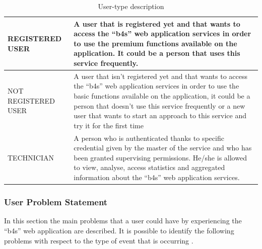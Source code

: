 \documentclass{article}
\begin{document}
\begin{table} [H]
    \begin{center}
        \begin{tabular}{|p{}|p{}|}
            \hline
            REGISTERED USER &   A user that is registered yet and that wants to access the “b4s” web application services in order to use the premium functions available  on  the application. It  could  be  a  person  that  uses this service frequently. \\ 
            \hline
            NOT REGISTERED USER &  
            A user  that  isn’t registered  yet  and  that  wants to access  the  “b4s”  web application  services  in  order  to  use the  basic functions available on the application, it could be a person that doesn’t use this service frequently or a new user that wants to start an approach to this service and try it for the first time  \\
            \hline
            TECHNICIAN &  
            A person who is authenticated thanks to specific credential given by the master of the service and who has been granted supervising permissions.   He/she  is  allowed  to  view,  analyse,  access  statistics  and aggregated information about the “b4s” web application services.
            \\
            \hline
        \end{tabular}
    \end{center}
\caption{User-type description}
\end{table}

\subsubsection{User Problem Statement}
In this section the main problems that a user could have by experiencing the “b4s” web application are described.
It is possible to identify the following problems with respect to the type of event that is occurring .
\end{document}
